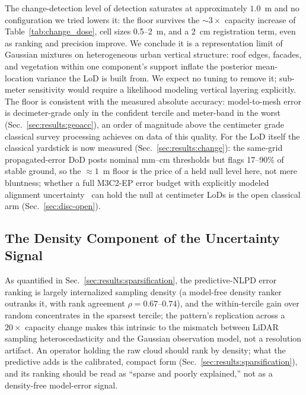  The change-detection level of detection saturates at approximately
$1.0$~m and no configuration we tried lowers it: the floor survives
the ${\sim}3\times$ capacity increase of Table~\ref{tab:change_dose},
cell sizes 0.5--2~m, and a 2~cm registration term, even as ranking
and precision improve. We conclude it is a representation limit of
Gaussian mixtures on heterogeneous urban vertical structure: roof
edges, facades, and vegetation within one component's support inflate
the posterior mean-location variance the LoD is built from. We
expect no tuning to remove it; sub-meter sensitivity would require a
likelihood modeling vertical layering explicitly. The floor is
consistent with the measured absolute accuracy: model-to-mesh error is
decimeter-grade only in the confident tercile and meter-band in the
worst (Sec.~\ref{sec:results:geoacc}), an order of magnitude above the
centimeter grade classical survey processing achieves on data of this
quality. For the LoD itself the classical yardstick is now measured
(Sec.~\ref{sec:results:change}): the same-grid propagated-error DoD
posts nominal mm--cm thresholds but flags 17--90\% of stable ground,
so the ${\approx}1$~m floor is the price of a held null level here,
not mere bluntness; whether a full M3C2-EP error budget with
explicitly modeled alignment
uncertainty~\cite{winiwarter2021m3c2ep} can hold the null at
centimeter LoDs is the open classical arm (Sec.~\ref{sec:disc-open}).

\subsection{The Density Component of the Uncertainty Signal}
\label{sec:disc-density}

 As quantified in Sec.~\ref{sec:results:sparsification}, the
predictive-NLPD error ranking is largely internalized sampling
density (a model-free density ranker outranks it, with rank
agreement $\rho = 0.67$--$0.74$), and the within-tercile gain over
random concentrates in the sparsest tercile; the pattern's
replication across a $20\times$ capacity change makes this intrinsic
to the mismatch between LiDAR sampling heteroscedasticity and the
Gaussian observation model, not a resolution artifact. An operator
holding the raw cloud should rank by density; what the predictive
adds is the calibrated, compact form
(Sec.~\ref{sec:results:sparsification}), and its ranking should be
read as ``sparse and poorly explained,'' not as a density-free
model-error signal.

